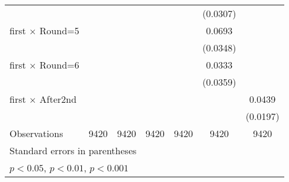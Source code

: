 {\begin{tabular}{l*{6}{c}}
                    &                     &                     &                     &                     &    (0.0307)         &                     \\
[1em]
first $\times$ Round=5&                     &                     &                     &                     &      0.0693\sym{*}  &                     \\
                    &                     &                     &                     &                     &    (0.0348)         &                     \\
[1em]
first $\times$ Round=6&                     &                     &                     &                     &      0.0333         &                     \\
                    &                     &                     &                     &                     &    (0.0359)         &                     \\
[1em]
first $\times$ After2nd&                     &                     &                     &                     &                     &      0.0439\sym{*}  \\
                    &                     &                     &                     &                     &                     &    (0.0197)         \\
\hline
Observations        &        9420         &        9420         &        9420         &        9420         &        9420         &        9420         \\
\hline\hline
\multicolumn{7}{l}{\footnotesize Standard errors in parentheses}\\
\multicolumn{7}{l}{\footnotesize \sym{*} \(p<0.05\), \sym{**} \(p<0.01\), \sym{***} \(p<0.001\)}\\
\end{tabular}
}
